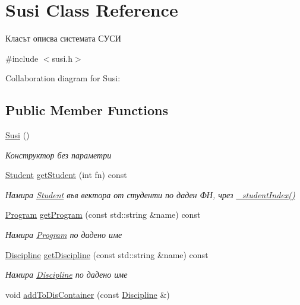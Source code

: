 \hypertarget{class_susi}{}\section{Susi Class Reference}
\label{class_susi}


Класът описва системата СУСИ  




{\ttfamily \#include $<$susi.\+h$>$}



Collaboration diagram for Susi\+:
\subsection*{Public Member Functions}
\begin{DoxyCompactItemize}
\item 
\hyperlink{class_susi_a787354112d858530b76a94845c47e99e}{Susi} ()
\begin{DoxyCompactList}\small\item\em Конструктор без параметри \end{DoxyCompactList}\item 
\hyperlink{class_student}{Student} \hyperlink{class_susi_acc0db9f4d2400a50649d76f1aa41482b}{get\+Student} (int fn) const
\begin{DoxyCompactList}\small\item\em Намира \hyperlink{class_student}{Student} във вектора от студенти по даден ФН, чрез \hyperlink{class_susi_a2c1e25d57c4cf29149803a4d86c8e585}{\+\_\+student\+Index()} \end{DoxyCompactList}\item 
\hyperlink{class_program}{Program} \hyperlink{class_susi_adebc81f1debd6b4cf54dd1db6c6ba9be}{get\+Program} (const std\+::string \&name) const
\begin{DoxyCompactList}\small\item\em Намира \hyperlink{class_program}{Program} по дадено име \end{DoxyCompactList}\item 
\hyperlink{class_discipline}{Discipline} \hyperlink{class_susi_ad996bd123ef25d812e3fc5d1717edf07}{get\+Discipline} (const std\+::string \&name) const
\begin{DoxyCompactList}\small\item\em Намира \hyperlink{class_discipline}{Discipline} по дадено име \end{DoxyCompactList}\item 
void \hyperlink{class_susi_a75d9497bae2d3c173ab21e684ad9704c}{add\+To\+Dis\+Container} (const \hyperlink{class_discipline}{Discipline} \&)

\end{DoxyCompactItemize}
